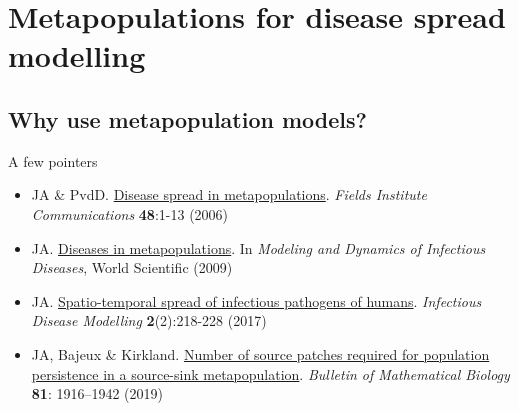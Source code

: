 \documentclass[aspectratio=169]{beamer}\usepackage[]{graphicx}\usepackage[]{xcolor}
\begin{document}
\section{Metapopulations for disease spread modelling}
\subsection{Why use metapopulation models?}


\begin{frame}{A few pointers}
	\begin{itemize}
		\item JA \& PvdD. \href{https://julien-arino.github.io/assets/pdf/papers/2006_ArinoPvdD-FIC48.pdf}{Disease spread in metapopulations}. \emph{Fields Institute Communications} \textbf{48}:1-13 (2006) \nocite{ArinoVdD2006a}
		\vfill
		\item JA. \href{https://julien-arino.github.io/assets/pdf/papers/2009_Arino-metapopulations.pdf}{Diseases in metapopulations}. In \emph{Modeling and Dynamics of Infectious Diseases}, World Scientific (2009) \nocite{Arino2009}
		\vfill
		\item JA. \href{https://doi.org/10.1016/j.idm.2017.05.001}{Spatio-temporal spread of infectious pathogens of humans}. \emph{Infectious Disease Modelling} \textbf{2}(2):218-228 (2017) \nocite{Arino2017}
		\vfill
		\item JA, Bajeux \& Kirkland. \href{https://doi.org/10.1007/s11538-019-00593-1}{Number of source patches required for population persistence in a source-sink metapopulation}. \emph{Bulletin of Mathematical Biology} \textbf{81}: 1916–1942 (2019) \nocite{ArinoBajeuxKirkland2019}
	\end{itemize}
\end{frame}
\end{document}
